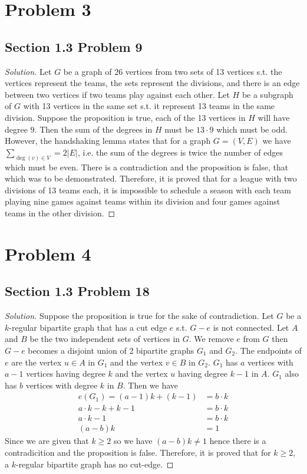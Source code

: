 \documentclass[12pt]{article}
\newenvironment*{solution}{\begin{proof}[Solution]}{\end{proof}}
\begin{document}
\section*{Problem 3}
\subsection*{Section 1.3 Problem 9}
\begin{solution}
    Let \(G\) be a graph of 26 vertices from two sets of 13 vertices s.t. the
    vertices represent the teams, the sets represent the divisions, and there
    is an edge between two vertices if two teams play against each other. Let
    \(H\) be a subgraph of \(G\) with 13 vertices in the same set s.t. it
    represent 13 teams in the same division. Suppose the proposition is true,
    each of the 13 vertices in \(H\) will have degree \(9\). Then the sum of
    the degrees in \(H\) must be \(13\cdot9\) which must be odd. However, the
    handshaking lemma states that for a graph \(G=(V,E)\) we have \(\sum_{\deg
    (v)\in V}=2|E|\), i.e. the sum of the degrees is twice the number of edges
    which must be even. There is a contradiction and the proposition is false,
    that which was to be demonstrated. Therefore, it is proved that for a
    league with two divisions of 13 teams each, it is impossible to schedule a
    season with each team playing nine games against teams within its division
    and four games against teams in the other division.
\end{solution}
\section*{Problem 4}
\subsection*{Section 1.3 Problem 18}
\begin{solution}
    Suppose the proposition is true for the sake of contradiction. Let \(G\)
    be a \(k\)-regular bipartite graph that has a cut edge \(e\) s.t. \(G-e\)
    is not connected. Let \(A\) and \(B\) be the two independent sets of
    vertices in \(G\). We remove \(e\) from \(G\) then \(G-e\) becomes a
    disjoint union of 2 bipartite graphs \(G_1\) and \(G_2\). The endpoints of
    \(e\) are the vertex \(u\in A\) in \(G_1\) and the vertex \(v\in B\) in
    \(G_2\). \(G_1\) has \(a\) vertices with \(a-1\) vertices having degree
    \(k\) and the vertex \(u\) having degree \(k-1\) in \(A\). \(G_1\) also
    has \(b\) vertices with degree \(k\) in \(B\). Then we have
    \begin{align*}
        e(G_1)=(a-1)k+(k-1) &= b\cdot k \\ a\cdot k-k+k-1 &= b\cdot k \\ a
        \cdot k-1 &= b\cdot k \\ (a-b)k &= 1
    \end{align*}
    Since we are given that \(k\geq2\) so we have \((a-b)k\neq1\) hence there
    is a contradicition and the proposition is false. Therefore, it is proved
    that for \(k\geq2\), a \(k\)-regular bipartite graph has no cut-edge.
\end{solution}
\end{document}
